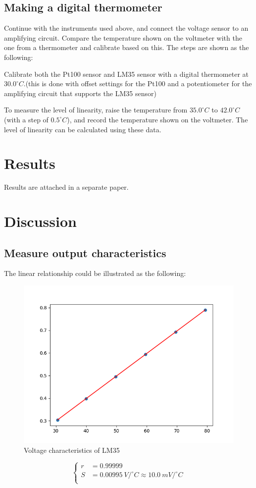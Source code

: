 \documentclass[a4paper]{article}
\begin{document}
\begin{multicols*}{2}
  \subsection*{Making a digital thermometer}
  Continue with the instruments used above, and connect the voltage sensor to an amplifying circuit. Compare the temperature shown on the voltmeter with the one from a thermometer and calibrate based on this. The steps are shown as the following:
  \par
  Calibrate both the Pt100 sensor and LM35 sensor with a digital thermometer at $30.0^\circ C$.(this is done with offset settings for the Pt100 and a potentiometer for the amplifying circuit that supports the LM35 sensor)
  \par
  To measure the level of linearity, raise the temperature from $35.0^\circ C$ to $42.0^\circ C$(with a step of $0.5^\circ C$), and record the temperature shown on the voltmeter. The level of linearity can be calculated using these data.

  \section*{Results}
  Results are attached in a separate paper.
  \newpage
  \section*{Discussion}
  \subsection*{Measure output characteristics}
  The linear relationship could be illustrated as the following:
  \begin{figure}[H]
    \centering
    \includegraphics[width=0.8\linewidth]{./img/1.png}
    \caption{Voltage characteristics of LM35}
    \label{fig:figure1}
  \end{figure}
  \begin{equation*}
    \left\{
    \begin{aligned}
      r & = 0.99999                                       \\
      S & = 0.00995\ V/^\circ C \approx 10.0\ mV/^\circ C \\
    \end{aligned}
    \right.
  \end{equation*}

\end{multicols*}
\end{document}
